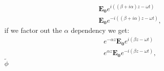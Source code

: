 \documentclass{article}
\begin{document}
\begin{align}
    &\bm{E_{0}}e^{i((\beta + i \alpha)z-\omega t)} \\
    &\bm{E_{0}}e^{-i((\beta + i \alpha)z-\omega t)}, 
\end{align}
if we factor out the $\alpha$ dependency we get:
\begin{align}
    &e^{-\alpha z}\bm{E_{0}}e^{i(\beta z-\omega t)} \\
    &e^{\alpha z}\bm{E_{0}}e^{-i(\beta z-\omega t)}, 
\end{align}
$\tilde{\phi}$
    
\end{document}
